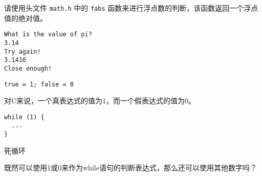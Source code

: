 \begin{frame}[fragile]\ft{\secname}
请使用头文件 \lstinline|math.h| 中的 \lstinline|fabs| 函数来进行浮点数的判断，该函数返回一个浮点值的绝对值。
\end{frame}

\begin{frame}\ft{\secname}

\end{frame}

\begin{frame}[fragile]\ft{\secname}
\begin{lstlisting}
What is the value of pi?
3.14
Try again!
3.1416
Close enough!
\end{lstlisting}
\end{frame}

\begin{frame}[fragile]

\pause

\begin{lstlisting}
true = 1; false = 0
\end{lstlisting}
\end{frame}

\begin{frame}[fragile]
对C来说，一个真表达式的值为1，而一个假表达式的值为0。
\end{frame}

\begin{frame}[fragile]

\begin{lstlisting}
while (1) {
  ...
}
\end{lstlisting}
\pause\vspace{.1in}

死循环
\end{frame}

\begin{frame}[fragile]
\begin{wenti}
既然可以使用1或0来作为while语句的判断表达式，那么还可以使用其他数字吗？
\end{wenti}
\end{frame}

\begin{frame}
      
\end{frame}

